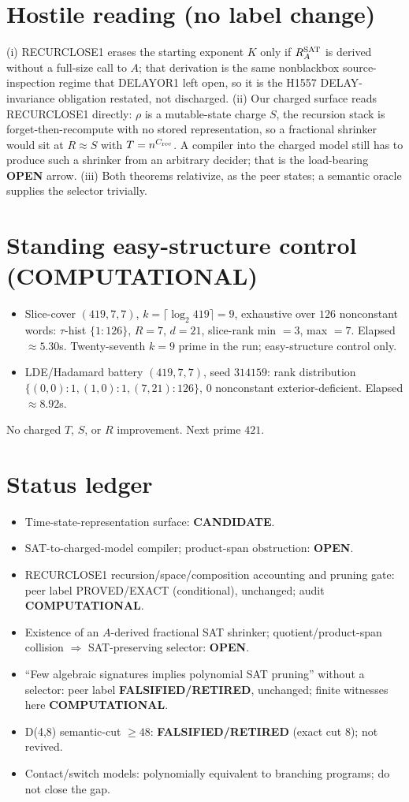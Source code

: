 \documentclass[11pt]{article}
\begin{document}
\section*{Hostile reading (no label change)}
(i) RECURCLOSE1 erases the starting exponent $K$ only if $R_A^{\rm SAT}$ is derived without a full-size call to $A$;
that derivation is the same nonblackbox source-inspection regime that DELAYOR1 left open, so it is the H1557
DELAY-invariance obligation restated, not discharged. (ii) Our charged surface reads RECURCLOSE1 directly: $\rho$ is a
mutable-state charge $S$, the recursion stack is forget-then-recompute with no stored representation, so a fractional
shrinker would sit at $R\approx S$ with $T=n^{C_{\rm rec}}$. A compiler into the charged model still has to produce
such a shrinker from an arbitrary decider; that is the load-bearing \textbf{OPEN} arrow. (iii) Both theorems relativize,
as the peer states; a semantic oracle supplies the selector trivially.

\section*{Standing easy-structure control (COMPUTATIONAL)}
\begin{itemize}
\item Slice-cover $(419,7,7)$, $k=\lceil\log_2 419\rceil=9$, exhaustive over $126$ nonconstant words:
$\tau$-hist $\{1{:}126\}$, $R=7$, $d=21$, slice-rank min $=3$, max $=7$. Elapsed $\approx5.30$s.
Twenty-seventh $k{=}9$ prime in the run; easy-structure control only.
\item LDE/Hadamard battery $(419,7,7)$, seed $314159$: rank distribution
$\{(0,0){:}1,(1,0){:}1,(7,21){:}126\}$, $0$ nonconstant exterior-deficient. Elapsed $\approx8.92$s.
\end{itemize}
No charged $T$, $S$, or $R$ improvement. Next prime $421$.

\section*{Status ledger}
\begin{itemize}
\item Time-state-representation surface: \textbf{CANDIDATE}.
\item SAT-to-charged-model compiler; product-span obstruction: \textbf{OPEN}.
\item RECURCLOSE1 recursion/space/composition accounting and pruning gate: peer label PROVED/EXACT (conditional), unchanged; audit \textbf{COMPUTATIONAL}.
\item Existence of an $A$-derived fractional SAT shrinker; quotient/product-span collision $\Rightarrow$ SAT-preserving selector: \textbf{OPEN}.
\item ``Few algebraic signatures implies polynomial SAT pruning'' without a selector: peer label \textbf{FALSIFIED/RETIRED}, unchanged; finite witnesses here \textbf{COMPUTATIONAL}.
\item D(4,8) semantic-cut $\ge48$: \textbf{FALSIFIED/RETIRED} (exact cut 8); not revived.
\item Contact/switch models: polynomially equivalent to branching programs; do not close the gap.
\end{itemize}
\end{document}
